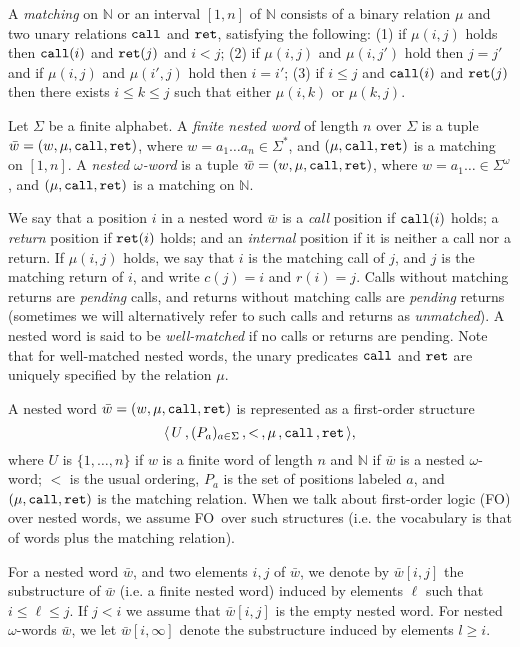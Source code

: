 \documentclass{LMCS}
\newcommand{\M}{{\mu}}
\newcommand{\w}{{\bar{w}}}
\newcommand{\FO}{{\rm FO}}
\renewcommand{\l}{\ell}
\theoremstyle{plain}
\theoremstyle{definition}
\newcommand{\retr}{\mathit{ret}}
\newcommand{\rett}{{\tt ret}}
\newcommand{\call}{{\tt call}}
\renewcommand{\retr}{\rett}
\newcommand{\nn}{{\mathbb N}}
\begin{document}
A {\em matching\/} on $\nn$ or an interval $[1,n]$ of $\nn$
consists of a binary relation $\M$ and two unary relations 
$\call$ and $\retr$, satisfying the following: (1) if
$\M(i,j)$ holds then $\call(i)$ and $\retr(j)$ and $i < j$; 
(2) if $\M(i,j)$ and $\M(i,j')$ hold
then $j = j'$ and if $\M(i,j)$ and $\M(i',j)$ hold then $i = i'$; 
(3) if $i\leq j$ and $\call(i)$ and $\retr(j)$ then
there exists $i\le k\le j$ such that either $\M(i,k)$ or $\M(k,j)$.

Let $\Sigma$ be a finite alphabet.  A {\em finite nested word} of
length $n$ over $\Sigma$ is a tuple $\w=(w,\M,\call,\retr)$, where
$w=a_1\ldots a_n\in \Sigma^*$, and $(\M,\call,\retr)$ is a matching on
$[1,n]$.  A {\em nested $\omega$-word} is a tuple
$\w=(w,\M,\call,\retr)$, where $w=a_1\ldots \in \Sigma^\omega$, and
$(\M,\call,\retr)$ is a matching on $\nn$.

We say that a position $i$ in a nested word 
$\w$ is a {\em call} position if $\call(i)$ holds;
a {\em return} position if $\retr(i)$ holds;
and an {\em internal} position if it is
neither a call nor a return.
If $\M(i,j)$ holds, we say that $i$ is the matching call of $j$, and $j$ is
the matching return of $i$, and write $c(j)=i$ and $r(i)=j$. 
Calls without matching returns are {\em pending\/} calls, and returns without
matching calls are {\em pending\/} returns (sometimes we will
alternatively refer to such calls and returns as {\em unmatched}).
A nested word is said to be {\em well-matched\/} if no calls or returns are 
pending. Note that for well-matched nested words, the unary predicates
$\call$ and $\retr$ are uniquely specified by the relation $\M$.

A nested word $\w=(w, \M,\call,\retr)$ is represented as a first-order structure
$$\langle\, U\,,(P_a)_{a \in \Sigma}\,,<\,,\M\,,\call\,,\retr\,\rangle,$$ where $U$ is
$\{1, \ldots, n\}$ if $w$ is a finite word of length $n$ and $\nn$ if
$\w$ is a nested $\omega$-word; $<$ is the usual ordering, $P_a$ is
the set of positions labeled $a$, and $(\M,\call,\retr)$ is the matching
relation. When we talk about first-order logic (\FO) over nested words,
we assume \FO\ over such structures
 (i.e. the vocabulary is that of words plus the matching relation).

For a nested word $\w$, and two elements $i,j$ of $\w$, we denote by
$\w[i,j]$ the substructure of $\w$ (i.e. a finite nested word) induced
by elements $\l$ such that $i \leq \l \leq j$. If $j < i$ we assume
that $\w[i,j]$ is the empty nested word.
For nested $\omega$-words $\w$, we let $\w[i,\infty]$ denote the substructure
induced by elements $l\ge i$.
\end{document}
